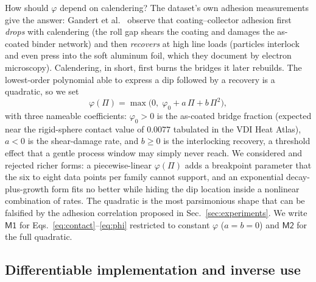 \documentclass[10pt,a4paper]{article}
\newcommand{\Mone}{\ensuremath{\mathsf{M1}}}
\newcommand{\Mtwo}{\ensuremath{\mathsf{M2}}}
\begin{document}
How should $\varphi$ depend on calendering? The dataset's own adhesion measurements give the answer: Gandert et al.\ \cite{gandert2023} observe that coating--collector adhesion first \emph{drops} with calendering (the roll gap shears the coating and damages the as-coated binder network) and then \emph{recovers} at high line loads (particles interlock and even press into the soft aluminum foil, which they document by electron microscopy). Calendering, in short, first burns the bridges it later rebuilds. The lowest-order polynomial able to express a dip followed by a recovery is a quadratic, so we set
\begin{equation}
\varphi(\Pi)=\max\!\bigl(0,\;\varphi_{0}+a\,\Pi+b\,\Pi^{2}\bigr),
\label{eq:phi}
\end{equation}
with three nameable coefficients: $\varphi_0>0$ is the as-coated bridge fraction (expected near the rigid-sphere contact value of $0.0077$ tabulated in the VDI Heat Atlas), $a<0$ is the shear-damage rate, and $b\ge0$ is the interlocking recovery, a threshold effect that a gentle process window may simply never reach. We considered and rejected richer forms: a piecewise-linear $\varphi(\Pi)$ adds a breakpoint parameter that the six to eight data points per family cannot support, and an exponential decay-plus-growth form fits no better while hiding the dip location inside a nonlinear combination of rates. The quadratic is the most parsimonious shape that can be falsified by the adhesion correlation proposed in Sec.~\ref{sec:experiments}. We write \Mone{} for Eqs.~\eqref{eq:contact}--\eqref{eq:phi} restricted to constant $\varphi$ ($a=b=0$) and \Mtwo{} for the full quadratic.

\subsection{Differentiable implementation and inverse use}
\label{sec:model:inverse}
\end{document}
